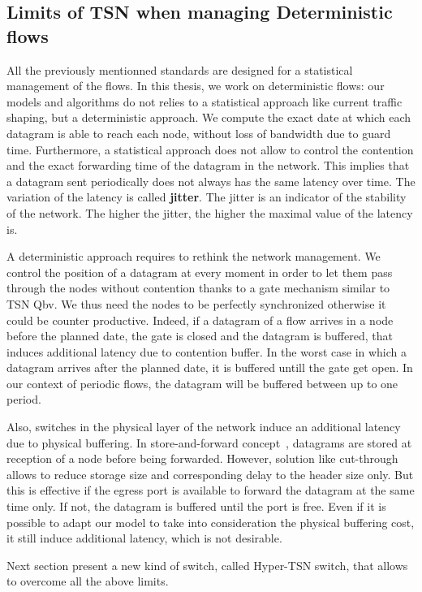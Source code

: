 \subsection{Limits of TSN when managing Deterministic flows}

All the previously mentionned standards are designed for a statistical management of the flows. In this thesis, we work on deterministic flows: our models and algorithms do not relies to a statistical approach like current traffic shaping, but a deterministic approach. We compute the exact date at which each datagram is able to reach each node, without loss of bandwidth due to guard time. Furthermore, a statistical approach does not allow to control the contention and the exact forwarding time of the datagram in the network. This implies that a datagram sent periodically does not always has the same latency over time. The variation of the latency is called \textbf{jitter}. The jitter is an indicator of the stability of the network. The higher the jitter, the higher the maximal value of the latency is.

A deterministic approach requires to rethink the network management. We control the position of a datagram at every moment in order to let them pass through the nodes without contention thanks to a gate mechanism similar to TSN Qbv. We thus need the nodes to be perfectly synchronized otherwise it could be counter productive. Indeed, if a datagram of a flow arrives in a node before the planned date, the gate is closed and the datagram is buffered, that induces additional latency due to contention buffer. In the worst case in which a datagram arrives after the planned date, it is buffered untill the gate get open. In our context of periodic flows, the datagram will be buffered between up to one period.

Also, switches in the physical layer of the network induce an additional latency due to physical buffering. In store-and-forward concept~\cite{tindell1992store}, datagrams are stored at reception of a node before being forwarded. However, solution like cut-through~\cite{kermani1979virtual} allows to reduce storage size and corresponding delay to the header size only. But this is effective if the egress port is available to forward the datagram at the same time only. If not, the datagram is buffered until the port is free. Even if it is possible to adapt our model to take into consideration the physical buffering cost, it still induce additional latency, which is not desirable.

Next section present a new kind of switch, called Hyper-TSN switch, that allows to overcome all the above limits.

